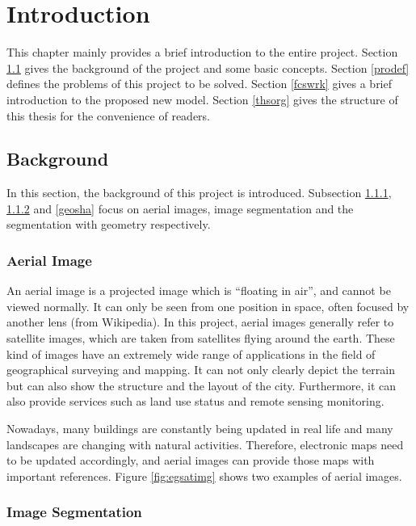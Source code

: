 \chapter{Introduction}

This chapter mainly provides a brief introduction to the entire project. Section \ref{bckgrd} gives the background of the project and some basic concepts. Section \ref{prodef} defines the problems of this project to be solved. Section \ref{fcswrk} gives a brief introduction to the proposed new model. Section \ref{thsorg} gives the structure of this thesis for the convenience of readers.

\section{Background}\label{bckgrd}

In this section, the background of this project is introduced. Subsection \ref{arlimg}, \ref{imgseg} and \ref{geosha} focus on aerial images, image segmentation and the segmentation with geometry respectively.

\subsection{Aerial Image}\label{arlimg}

An aerial image is a projected image which is ``floating in air'', and cannot be viewed normally. It can only be seen from one position in space, often focused by another lens (from Wikipedia). In this project, aerial images generally refer to satellite images, which are taken from satellites flying around the earth. These kind of images have an extremely wide range of applications in the field of geographical surveying and mapping. It can not only clearly depict the terrain but can also show the structure and the layout of the city. Furthermore, it can also provide services such as land use status and remote sensing monitoring.

Nowadays, many buildings are constantly being updated in real life and many landscapes are changing with natural activities. Therefore, electronic maps need to be updated accordingly, and aerial images can provide those maps with important references. Figure \ref{fig:egsatimg} shows two examples of aerial images.



\subsection{Image Segmentation}\label{imgseg}

